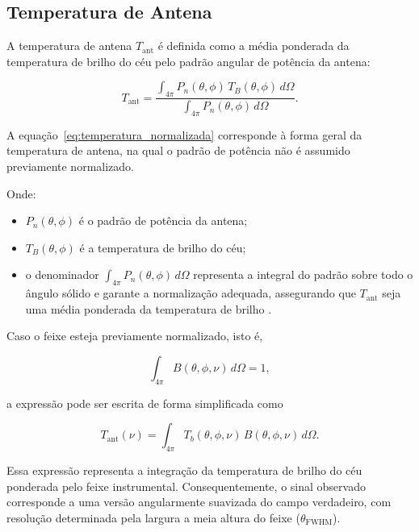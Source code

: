 \subsection*{Temperatura de Antena}

A temperatura de antena \(T_{\mathrm{ant}}\) é definida como a média ponderada da temperatura de brilho do céu pelo padrão angular de potência da antena:

\begin{equation}
T_{\mathrm{ant}} =
\frac{
\displaystyle \int_{4\pi} P_n(\theta,\phi)\, T_B(\theta,\phi)\, d\Omega
}{
\displaystyle \int_{4\pi} P_n(\theta,\phi)\, d\Omega
}.
\label{eq:temperatura_normalizada}
\end{equation}

A equação~\ref{eq:temperatura_normalizada} corresponde à forma geral da temperatura de antena, na qual o padrão de potência não é assumido previamente normalizado.

Onde:

\begin{itemize}
    \item \(P_n(\theta,\phi)\) é o padrão de potência da antena;
    \item \(T_B(\theta,\phi)\) é a temperatura de brilho do céu;
    \item o denominador \(\displaystyle \int_{4\pi} P_n(\theta,\phi)\, d\Omega\) representa a integral do padrão sobre todo o ângulo sólido e garante a normalização adequada, assegurando que \(T_{\mathrm{ant}}\) seja uma média ponderada da temperatura de brilho \cite{sasao2009_radioantennas}.
\end{itemize}

Caso o feixe esteja previamente normalizado, isto é,

\[
\int_{4\pi} B(\theta,\phi,\nu)\, d\Omega = 1,
\]

a expressão pode ser escrita de forma simplificada como

\begin{equation}
T_{\mathrm{ant}}(\nu) =
\int_{4\pi}
T_b(\theta,\phi,\nu)\,
B(\theta,\phi,\nu)\,
d\Omega.
\label{eq:temperatura_feixe_normalizado}
\end{equation}

Essa expressão representa a integração da temperatura de brilho do céu ponderada pelo feixe instrumental. Consequentemente, o sinal observado corresponde a uma versão angularmente suavizada do campo verdadeiro, com resolução determinada pela largura a meia altura do feixe (\(\theta_{\mathrm{FWHM}}\)).

